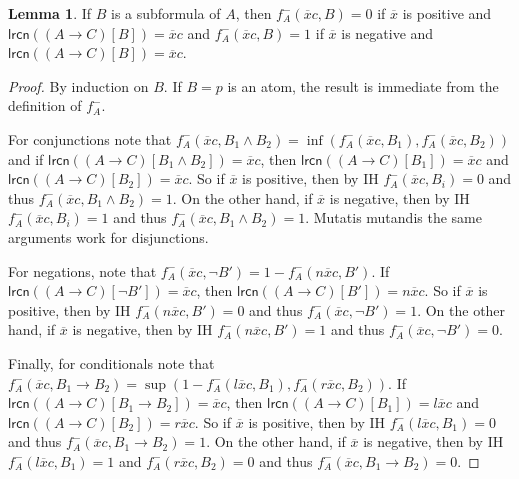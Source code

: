 \documentclass{amsart}
\theoremstyle{definition}
\newtheorem{lemma}{Lemma}
\newcommand{\lrcn}{\mathsf{lrcn}}
\begin{document}
\begin{lemma}
    If $B$ is a subformula of $A$, then $f^-_A(\overline{x}c,B)=0$ if $\overline{x}$ is positive and $\lrcn((A\to C)[B])=\overline{x}c$ and $f^-_A(\overline{x}c,B)=1$ if $\overline{x}$ is negative and $\lrcn((A\to C)[B])=\overline{x}c$.
\end{lemma}
\begin{proof}
    By induction on $B$. If $B=p$ is an atom, the result is immediate from the definition of $f^-_A$. 

    For conjunctions note that $f^-_A(\overline{x}c,B_1\land B_2)=\inf(f^-_A(\overline{x}c,B_1),f^-_A(\overline{x}c,B_2))$ and if $\lrcn((A\to C)[B_1\land B_2])=\overline{x}c$, then $\lrcn((A\to C)[B_1])=\overline{x}c$ and $\lrcn((A\to C)[B_2])=\overline{x}c$. So if $\overline{x}$ is positive, then by IH $f^-_A(\overline{x}c,B_i)=0$ and thus $f^-_A(\overline{x}c,B_1\land B_2)=1$. On the other hand, if $\overline{x}$ is negative, then by IH $f^-_A(\overline{x}c,B_i)=1$ and thus $f^-_A(\overline{x}c,B_1\land B_2)=1$. Mutatis mutandis the same arguments work for disjunctions.

    For negations, note that $f^-_A(\overline{x}c,\neg B')=1-f^-_A(n\overline{x}c,B')$. If $\lrcn((A\to C)[\neg B'])=\overline{x}c$, then $\lrcn((A\to C)[B'])=n\overline{x}c$. So if $\overline{x}$ is positive, then by IH $f^-_A(n\overline{x}c,B')=0$ and thus $f^-_A(\overline{x}c,\neg B')=1$. On the other hand, if $\overline{x}$ is negative, then by IH $f^-_A(n\overline{x}c,B')=1$ and thus $f^-_A(\overline{x}c,\neg B')=0$. 

    Finally, for conditionals note that $f^-_A(\overline{x}c,B_1\to B_2)=\sup(1-f^-_A(l\overline{x}c,B_1),f^-_A(r\overline{x}c,B_2))$. If $\lrcn((A\to C)[B_1\to B_2])=\overline{x}c$, then $\lrcn((A\to C)[B_1])=l\overline{x}c$ and $\lrcn((A\to C)[B_2])=r\overline{x}c$. So if $\overline{x}$ is positive, then by IH $f^-_A(l\overline{x}c,B_1)=0$ and thus $f^-_A(\overline{x}c,B_1\to B_2)=1$. On the other hand, if $\overline{x}$ is negative, then by IH $f^-_A(l\overline{x}c,B_1)=1$ and $f^-_A(r\overline{x}c,B_2)=0$ and thus $f^-_A(\overline{x}c,B_1\to B_2)=0$. 
\end{proof}
\end{document}
